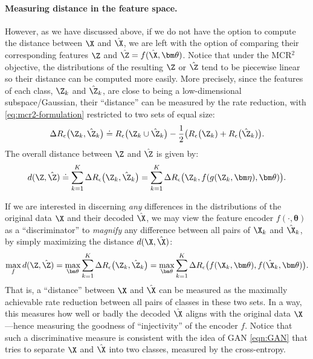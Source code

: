 \documentclass[../../book-main.tex]{subfiles}
\begin{document}
\paragraph{Measuring distance in the feature space.}
However, as we have discussed above, if we do not have the option to compute the distance between $\X$ and $\hat \X$, we are left with the option of comparing their corresponding features $\Z$ and $\hat \Z = f(\hat \X, \bm \theta)$. Notice that under the MCR$^2$ objective, the distributions of the resulting $\Z$ or $\hat \Z$ tend to be piecewise linear so their distance can be computed more easily. More precisely, since the features of each class, $\Z_k$ and $\hat{\Z}_k$, are close to being a low-dimensional subspace/Gaussian, their ``distance'' can be measured by the rate reduction, with \eqref{eq:mcr2-formulation} restricted to two sets of equal size:
\begin{equation}
\Delta R_\epsilon\big(\Z_k, \hat{\Z}_k\big) \doteq R_\epsilon\big(\Z_k \cup \hat{\Z}_k\big) - \frac{1}{2} \big( R_\epsilon\big(\Z_k) + R_\epsilon\big(\hat \Z_k)\big).
\end{equation}
The overall distance between $\Z$ and $\hat \Z$ is given by:
\begin{equation}
d(\Z, \hat \Z) \doteq   \sum_{k=1}^K \Delta R_\epsilon\big(\Z_k, \hat{\Z}_k\big) =  \sum_{k=1}^K \Delta R_\epsilon\big(\Z_k, f(g(\Z_k, \bm\eta),\bm \theta)\big).
\label{eqn:Z-distance}
\end{equation}


If we are interested in discerning {\em any} differences in the distributions of the original data $\X$ and their decoded $\hat \X$, we may view the feature encoder $f(\cdot, \bm \theta)$ as a ``discriminator'' to {\em magnify} any difference between all pairs of $\X_k$ and $\hat \X_k$, by simply maximizing the distance $d(\X, \hat \X)$:
\begin{equation}
\max_f d(\Z, \hat \Z) = \max_{\bm \theta} \sum_{k=1}^K \Delta R_\epsilon\big(\Z_k, \hat{\Z}_k\big) = \max_{\bm \theta} \sum_{k=1}^K \Delta R_\epsilon\big(f(\X_k,\bm \theta), f(\hat{\X}_k,\bm \theta)\big).
    \label{eqn:max-distance}
\end{equation}
That is, a ``distance'' between $\X$ and $\hat \X$ can be measured as the maximally achievable rate reduction between all pairs of classes in these two sets. In a way, this measures how well or badly the decoded $\hat \X$ aligns with the original data $\X$---hence measuring the goodness of ``injectivity'' of the encoder $f$. Notice that such a discriminative measure is consistent with the idea of GAN \eqref{eqn:GAN} that tries to separate $\X$ and $\hat \X$ into two classes, measured by the cross-entropy. 
\end{document}
